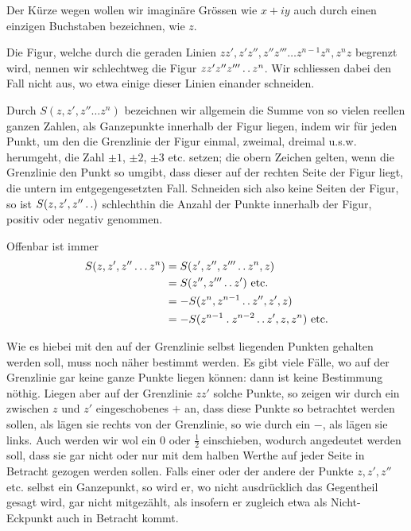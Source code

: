 %
Der Kürze wegen wollen wir imaginäre Grössen wie $x+iy$ auch durch einen einzigen Buchstaben bezeichnen, wie $z$.

Die Figur, welche durch die geraden Linien $zz',z'z'',z''z'''\ldots z^{n-1}z^n,z^nz$ begrenzt wird, nennen wir schlechtweg die Figur $zz'z''z'''\mathinner{.\,.} z^n$. Wir schliessen dabei den Fall nicht aus, wo etwa einige dieser Linien einander schneiden.

Durch $S(z,z',z''\ldots z^n)$ bezeichnen wir allgemein die Summe von so vielen reellen ganzen Zahlen, als Ganzepunkte innerhalb der Figur liegen, indem wir für jeden Punkt, um den die Grenzlinie der Figur einmal, zweimal, dreimal u.s.w. herumgeht, die Zahl $\pm1$, $\pm2$, $\pm3$ etc. setzen; die obern Zeichen gelten, wenn die Grenzlinie den Punkt so umgibt, dass dieser auf der rechten Seite der Figur liegt, die untern im entgegengesetzten Fall. Schneiden sich also keine Seiten der Figur, so ist $S(z,z',z''\mathinner{.\,.})$ schlechthin die Anzahl der Punkte innerhalb der Figur, positiv oder negativ genommen.

Offenbar ist immer
\[
\begin{aligned}
S(z,z',z''\ldots z^n)&=S(z',z'',z'''\mathinner{.\,.} z^n,z)\\
&=S(z'',z'''\mathinner{.\,.} z')\text{ etc.}\\
&=-S(z^n,z^{n-1}\mathinner{.\,.} z'',z',z)\\
&=-S(z^{n-1}\mathbin{.} z^{n-2}\mathinner{.\,.} z',z,z^n)\text{ etc.}
\end{aligned}
\]

Wie es hiebei mit den auf der Grenzlinie selbst liegenden Punkten gehalten werden soll, muss noch näher bestimmt werden. Es gibt viele Fälle, wo auf der Grenzlinie gar keine ganze Punkte liegen können: dann ist keine Bestimmung nöthig. Liegen aber auf der Grenzlinie $zz'$ solche Punkte, so zeigen wir durch ein zwischen $z$ und $z'$ eingeschobenes $+$ an, dass diese Punkte so betrachtet werden sollen, als lägen sie rechts von der Grenzlinie, so wie durch ein $-$, als lägen sie links. Auch werden wir wol ein $0$ oder $\frac12$ einschieben, wodurch angedeutet werden soll, dass sie gar nicht oder nur mit dem halben Werthe auf
%
jeder Seite in Betracht gezogen werden sollen. Falls einer oder der andere der Punkte $z,z',z''$ etc. selbst ein Ganzepunkt, so wird er, wo nicht ausdrücklich das Gegentheil gesagt wird, gar nicht mitgezählt, als insofern er zugleich etwa als Nicht-Eckpunkt auch in Betracht kommt.

